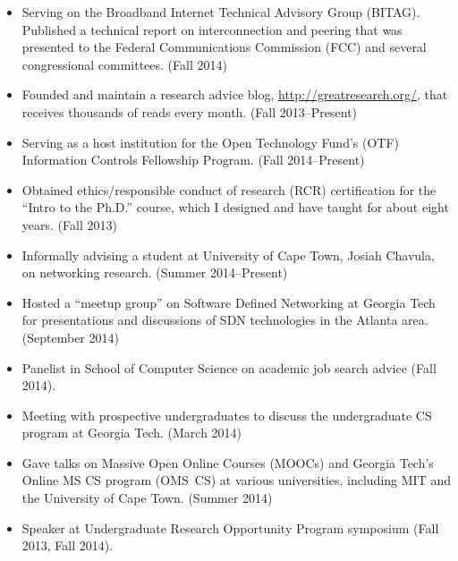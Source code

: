 \documentclass{article}
\begin{document}
\begin{cv}{}
\begin{itemize}
\itemsep=-1pt
\item Serving on the Broadband Internet Technical Advisory Group (BITAG).
  Published a technical report on interconnection and peering that
  was presented to the Federal Communications Commission (FCC) and
  several congressional committees. (Fall 2014)
\item Founded and maintain a research advice blog,
  \url{http://greatresearch.org/}, that receives thousands of reads
  every month. (Fall 2013--Present)
\item Serving as a host institution for the Open Technology Fund's (OTF)
  Information Controls Fellowship Program. (Fall 2014--Present)
\item Obtained ethics/responsible conduct of research (RCR)
  certification for the ``Intro to the Ph.D.'' course, which I designed
  and have taught for about eight years. (Fall 2013)
\item Informally advising a student at University of Cape Town, Josiah Chavula, on
  networking research. (Summer 2014--Present)
\item Hosted a ``meetup group'' on Software Defined Networking at
  Georgia Tech for presentations and discussions of SDN technologies in
  the Atlanta area. (September 2014)
\item Panelist in School of Computer Science on academic job search advice
  (Fall 2014).
\item Meeting with prospective undergraduates to discuss the
  undergraduate CS program at Georgia Tech. (March 2014)
\item Gave talks on Massive Open Online Courses (MOOCs) and Georgia
  Tech's Online MS CS program (OMS~CS) at various universities,
  including MIT and the University of Cape Town. (Summer 2014)
\item Speaker at Undergraduate Research Opportunity Program symposium
  (Fall 2013, Fall 2014).
\end{itemize}

\end{cv}
\end{document}
